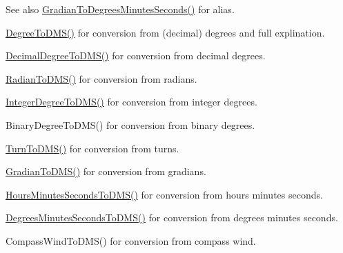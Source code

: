 \begin{DoxySeeAlso}{See also}
\mbox{\hyperlink{group___e_g_x_math-_conversions-_angle_conversions-_gradian_ga5c81967ddb8f677634d161713174e419}{Gradian\+To\+Degrees\+Minutes\+Seconds()}} for alias. 

\mbox{\hyperlink{group___e_g_x_math-_conversions-_angle_conversions-_degree_ga1096d04647918e20f61fb184ba2a7dce}{Degree\+To\+D\+M\+S()}} for conversion from (decimal) degrees and full explination. 

\mbox{\hyperlink{group___e_g_x_math-_conversions-_angle_conversions-_decimal_degree_ga64a1b298ce16e9edf3209b678a7bed46}{Decimal\+Degree\+To\+D\+M\+S()}} for conversion from decimal degrees. 

\mbox{\hyperlink{group___e_g_x_math-_conversions-_angle_conversions-_radian_gaf80be0c5c65ccaa5544a08a7754f3575}{Radian\+To\+D\+M\+S()}} for conversion from radians. 

\mbox{\hyperlink{group___e_g_x_math-_conversions-_angle_conversions-_integer_degree_gaf76779bcc23268b41d4c3a7610d60eaf}{Integer\+Degree\+To\+D\+M\+S()}} for conversion from integer degrees. 

Binary\+Degree\+To\+D\+M\+S() for conversion from binary degrees. 

\mbox{\hyperlink{group___e_g_x_math-_conversions-_angle_conversions-_turn_ga6ca011c0ae55ae079402080d7a1b4010}{Turn\+To\+D\+M\+S()}} for conversion from turns. 

\mbox{\hyperlink{group___e_g_x_math-_conversions-_angle_conversions-_gradian_ga0b6700b55ab4a24fa581bf2af0dafdaa}{Gradian\+To\+D\+M\+S()}} for conversion from gradians. 

\mbox{\hyperlink{group___e_g_x_math-_conversions-_angle_conversions-_hours_minutes_seconds_ga8fe72f56eebb44d7e8d7033476bbdd9b}{Hours\+Minutes\+Seconds\+To\+D\+M\+S()}} for conversion from hours minutes seconds. 

\mbox{\hyperlink{group___e_g_x_math-_conversions-_angle_conversions-_degrees_minutes_seconds_gae6652ea4b358b3f35f6b7c18faffabb2}{Degrees\+Minutes\+Seconds\+To\+D\+M\+S()}} for conversion from degrees minutes seconds. 

Compass\+Wind\+To\+D\+M\+S() for conversion from compass wind. 
\end{DoxySeeAlso}
\mbox{\label{group___e_g_x_math-_conversions-_angle_conversions-_gradian_gaff399262b6c8455e450e0a9dc8eb2ad1}} 
